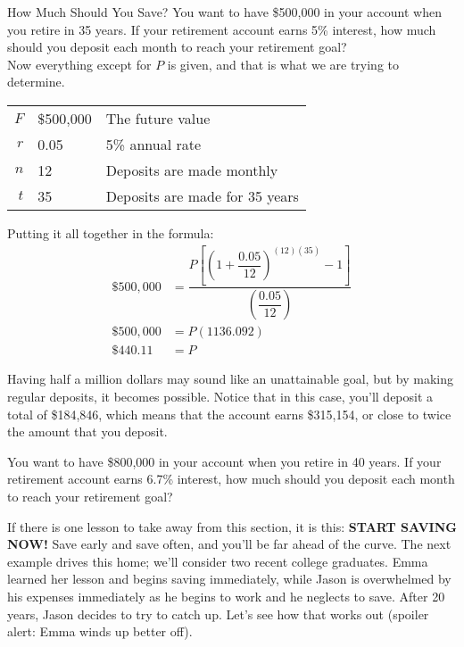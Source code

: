 \begin{example}[https://www.youtube.com/watch?v=TWZhZoh9TG4]{How Much Should You Save?}
You want to have \$500,000 in your account when you retire in 35 years.  If your retirement account earns 5\% interest, how much should you deposit each month to reach your retirement goal?\\

Now everything except for $P$ is given, and that is what we are trying to determine.
\begin{center}
\begin{tabular}{r l l}
$F$ & \$500,000 & The future value\\
$r$ & 0.05 & 5\% annual rate\\
$n$ & 12 & Deposits are made monthly\\
$t$ & 35 & Deposits are made for 35 years
\end{tabular}
\end{center}

Putting it all together in the formula:
\begin{align*}
\$500,000 &= \dfrac{P\left[\left(1+\dfrac{0.05}{12}\right)^{(12)(35)}-1\right]}{\left(\dfrac{0.05}{12}\right)}\\
\$500,000 &= P(1136.092)\\
\$440.11 &= P
\end{align*}

Having half a million dollars may sound like an unattainable goal, but by making regular deposits, it becomes possible.  Notice that in this case, you'll deposit a total of \$184,846, which means that the account earns \$315,154, or close to twice the amount that you deposit.
\end{example}
\vfill
\pagebreak

\begin{try}
You want to have \$800,000 in your account when you retire in 40 years.  If your retirement account earns 6.7\% interest, how much should you deposit each month to reach your retirement goal?
\end{try}

If there is one lesson to take away from this section, it is this: \textbf{START SAVING NOW!}  Save early and save often, and you'll be far ahead of the curve.  The next example drives this home; we'll consider two recent college graduates.  Emma learned her lesson and begins saving immediately, while Jason is overwhelmed by his expenses immediately as he begins to work and he neglects to save.  After 20 years, Jason decides to try to catch up.  Let's see how that works out (spoiler alert: Emma winds up better off).

